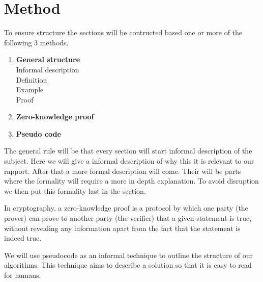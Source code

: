 \section{Method}
To ensure structure the sections will be contructed based one or more of the following 3 methods.
\begin{enumerate}
    \item \textbf{General structure}  \\
    Informal description\\
    Definition\\
    Example\\
    Proof    
    \item \textbf{Zero-knowledge proof}
    \item \textbf{Pseudo code} 
\end{enumerate}

 The general rule will be that every section will start informal description of the subject. Here we will give a informal description of why this it is relevant to our rapport. After that a more formal description will come. Their will be parts where the formality will require a more in depth explanation. To avoid disruption we then put this formality last in the section.    


 In cryptography, a zero-knowledge proof is a protocol by which one party (the prover) can prove to another party (the verifier) that a given statement is true, without revealing any information apart from the fact that the statement is indeed true.


 We will use pseudocode as an informal technique to outline the structure of our algorithms. This technique aims to describe a solution so that it is easy to read for humans.



